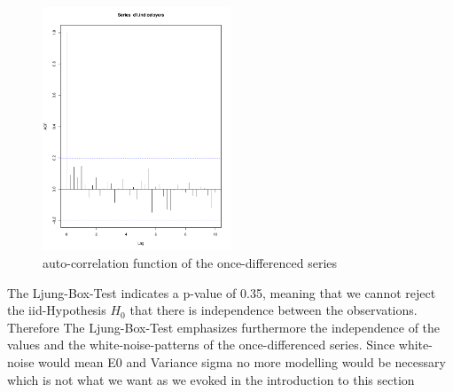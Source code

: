 \documentclass[11pt,a4paper]{article}
\begin{document}
\begin{figure}[!htb]
\centering
\includegraphics[angle=0,
width=0.5\textwidth]{diff1_acf}
\caption{auto-correlation function of the once-differenced series
\label{fig:diff1_acf}}
\end{figure}
The Ljung-Box-Test \citep{LjungBox78} indicates a p-value of 0.35, meaning that we cannot reject the iid-Hypothesis $H_0$ that there is independence between the observations. Therefore The Ljung-Box-Test emphasizes furthermore the independence of the values and the white-noise-patterns of the once-differenced series. Since white-noise would mean E0 and Variance sigma no more modelling would be necessary which is not what we want as we evoked in the introduction to this section
\end{document}
